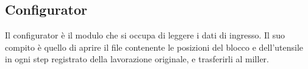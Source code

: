 \subsection{Configurator}
Il configurator è il modulo che si occupa di leggere i dati di ingresso. Il suo compito è quello di aprire il file contenente le posizioni del blocco e dell'utensile in ogni step registrato della lavorazione originale, e trasferirli al miller.



